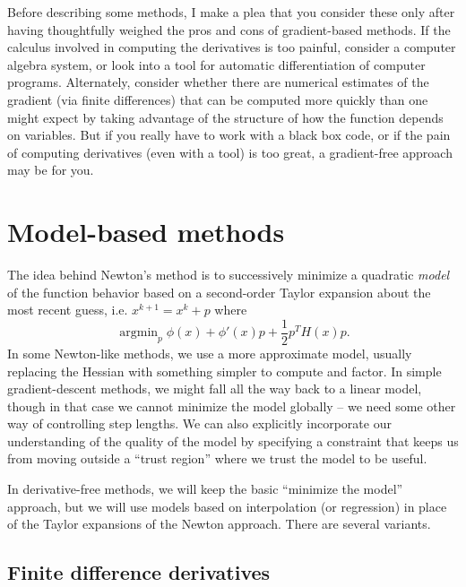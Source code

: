 \documentclass[12pt, leqno]{article} %
\begin{document}
Before describing some methods, I make a plea that you consider
these only after having thoughtfully weighed the pros and cons of
gradient-based methods.  If the calculus involved in computing
the derivatives is too painful, consider a computer algebra system,
or look into a tool for automatic differentiation of computer
programs.  Alternately, consider whether there are numerical estimates
of the gradient (via finite differences) that can be computed more
quickly than one might expect by taking advantage of the structure
of how the function depends on variables.  But if you really have to
work with a black box code, or if the pain of computing derivatives
(even with a tool) is too great, a gradient-free approach may be for you.

\section{Model-based methods}

The idea behind Newton's method is to successively minimize a
quadratic {\em model} of the function behavior based on a second-order
Taylor expansion about the most recent guess, i.e. $x^{k+1} = x^k + p$
where
\[
  \operatorname{argmin}_{p} \phi(x) + \phi'(x) p + \frac{1}{2} p^T H(x) p.
\]
In some Newton-like methods, we use a more approximate model, usually
replacing the Hessian with something simpler to compute and factor.
In simple gradient-descent methods, we might fall all the way back to
a linear model, though in that case we cannot minimize the model
globally -- we need some other way of controlling step lengths.
We can also explicitly incorporate our understanding of the quality of
the model by specifying a constraint that keeps us from moving outside
a ``trust region'' where we trust the model to be useful.

In derivative-free methods, we will keep the basic ``minimize the
model'' approach, but we will use models based on interpolation
(or regression) in place of the Taylor expansions of the Newton
approach.  There are several variants.

\subsection{Finite difference derivatives}
\end{document}
